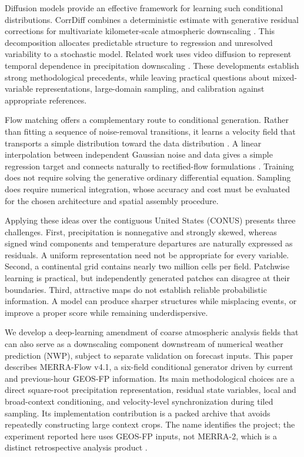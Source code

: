 \documentclass[10pt]{article}
\newcommand{\model}{MERRA-Flow}
\begin{document}
Diffusion models provide an effective framework for learning such conditional distributions. CorrDiff combines a deterministic estimate with generative residual corrections for multivariate kilometer-scale atmospheric downscaling \citep{mardani2025}. This decomposition allocates predictable structure to regression and unresolved variability to a stochastic model. Related work uses video diffusion to represent temporal dependence in precipitation downscaling \citep{srivastava2024}. These developments establish strong methodological precedents, while leaving practical questions about mixed-variable representations, large-domain sampling, and calibration against appropriate references.

Flow matching offers a complementary route to conditional generation. Rather than fitting a sequence of noise-removal transitions, it learns a velocity field that transports a simple distribution toward the data distribution \citep{lipman2023}. A linear interpolation between independent Gaussian noise and data gives a simple regression target and connects naturally to rectified-flow formulations \citep{liu2023}. Training does not require solving the generative ordinary differential equation. Sampling does require numerical integration, whose accuracy and cost must be evaluated for the chosen architecture and spatial assembly procedure.

Applying these ideas over the contiguous United States (CONUS) presents three challenges. First, precipitation is nonnegative and strongly skewed, whereas signed wind components and temperature departures are naturally expressed as residuals. A uniform representation need not be appropriate for every variable. Second, a continental grid contains nearly two million cells per field. Patchwise learning is practical, but independently generated patches can disagree at their boundaries. Third, attractive maps do not establish reliable probabilistic information. A model can produce sharper structures while misplacing events, or improve a proper score while remaining underdispersive.

We develop a deep-learning amendment of coarse atmospheric analysis fields that can also serve as a downscaling component downstream of numerical weather prediction (NWP), subject to separate validation on forecast inputs. This paper describes \model{} v4.1, a six-field conditional generator driven by current and previous-hour GEOS-FP information. Its main methodological choices are a direct square-root precipitation representation, residual state variables, local and broad-context conditioning, and velocity-level synchronization during tiled sampling. Its implementation contribution is a packed archive that avoids repeatedly constructing large context crops. The name identifies the project; the experiment reported here uses GEOS-FP inputs, not MERRA-2, which is a distinct retrospective analysis product \citep{gelaro2017}.
\end{document}
